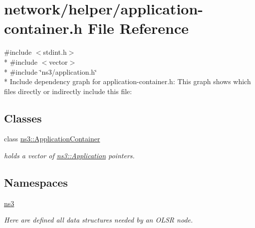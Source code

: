 \hypertarget{application-container_8h}{}\section{network/helper/application-\/container.h File Reference}
\label{application-container_8h}
{\ttfamily \#include $<$stdint.\+h$>$}\\*
{\ttfamily \#include $<$vector$>$}\\*
{\ttfamily \#include \char`\"{}ns3/application.\+h\char`\"{}}\\*
Include dependency graph for application-\/container.h\+:
This graph shows which files directly or indirectly include this file\+:
\subsection*{Classes}
\begin{DoxyCompactItemize}
\item 
class \hyperlink{classns3_1_1ApplicationContainer}{ns3\+::\+Application\+Container}
\begin{DoxyCompactList}\small\item\em holds a vector of \hyperlink{classns3_1_1Application}{ns3\+::\+Application} pointers. \end{DoxyCompactList}\end{DoxyCompactItemize}
\subsection*{Namespaces}
\begin{DoxyCompactItemize}
\item 
 \hyperlink{namespacens3}{ns3}
\begin{DoxyCompactList}\small\item\em Here are defined all data structures needed by an O\+L\+SR node. \end{DoxyCompactList}\end{DoxyCompactItemize}
